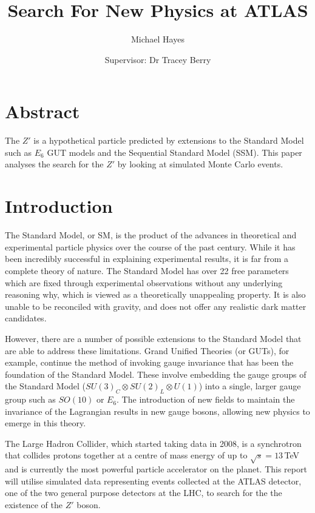 \documentclass{article}
\title{Search For New Physics at ATLAS}
\author{Michael Hayes}
\date{Supervisor: Dr Tracey Berry}
\begin{document}
\maketitle
\large
\onehalfspacing
\section*{Abstract}
\addtocounter{section}{1}
The $Z'$ is a hypothetical particle predicted by extensions to the Standard Model such as $E_6$ GUT models and the Sequential Standard Model (SSM). This paper analyses the search for the $Z'$ by looking at simulated Monte Carlo events.

\clearpage
\normalsize
\tableofcontents
\clearpage
\large

\section{Introduction}%
\label{sec:Introduction}
The Standard Model, or SM, is the product of the advances in theoretical and experimental particle physics over the course of the past century. While it has been incredibly successful in explaining experimental results, it is far from a complete theory of nature. The Standard Model has over 22 free parameters which are fixed through experimental observations without any underlying reasoning why, which is viewed as a theoretically unappealing property. It is also unable to be reconciled with gravity, and does not offer any realistic dark matter candidates. 

However, there are a number of possible extensions to the Standard Model that are able to address these limitations. Grand Unified Theories (or GUTs), for example, continue the method of invoking gauge invariance that has been the foundation of the Standard Model. These involve embedding the gauge groups of the Standard Model ($SU(3)_C \otimes SU(2)_L \otimes U(1)$) into a single, larger gauge group such as $SO(10)$ or $E_6$. The introduction of new fields to maintain the invariance of the Lagrangian results in new gauge bosons, allowing new physics to emerge in this theory.

The Large Hadron Collider, which started taking data in 2008, is a synchrotron that collides protons together at a centre of mass energy of up to $\sqrt{s} = 13\,$TeV and is currently the most powerful particle accelerator on the planet. This report will utilise simulated data representing events collected at the ATLAS detector, one of the two general purpose detectors at the LHC, to search for the the existence of the $Z'$ boson.
\end{document}
